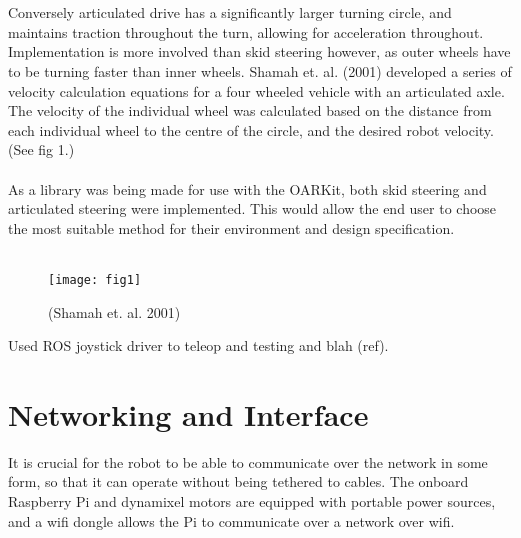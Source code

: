 \documentclass[]{article}
\begin{document}
\\
\\
Conversely articulated drive has a significantly larger turning circle, and  maintains traction throughout the turn, allowing for acceleration throughout. Implementation is more involved than skid steering however, as outer wheels have to be turning faster than inner wheels. Shamah et. al. (2001) developed a series of velocity calculation equations for a four wheeled vehicle with an articulated axle. The velocity of the individual wheel was calculated based on the distance from each individual wheel to the centre of the circle, and the desired robot velocity. (See fig 1.)
\\
\\
As a library was being made for use with the OARKit, both skid steering and articulated steering were implemented. This would allow the end user to choose the most suitable method for their environment and design specification.
\\
\\
\begin{figure}
\texttt{[image: fig1]}
\caption{(Shamah et. al. 2001)}
\end{figure}
Used ROS joystick driver to teleop and testing and blah (ref).

\section{Networking and Interface}
It is crucial for the robot to be able to communicate over the network in some form, so that it can operate without being tethered to cables. The onboard Raspberry Pi and dynamixel motors are equipped with portable power sources, and a wifi dongle allows the Pi to communicate over a network over wifi.
\end{document}

